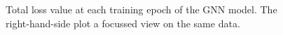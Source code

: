 \documentclass[
	fontsize=10pt, %
	twoside=true, %
	secnumdepth=1, %
  toc=indentunnumbered %
]{kaobook}
\begin{document}
\begin{figure}[h]
  \centering
  \begin{subfigure}[h]{0.49\linewidth}
  \end{subfigure}
  \begin{subfigure}[h]{0.49\linewidth}
  \end{subfigure}
  \caption{Total loss value at each training epoch of the GNN model. The right-hand-side plot a
    focussed view on the same data.}
  \label{fig:svm-repro-loss}
\end{figure}




\end{document}
